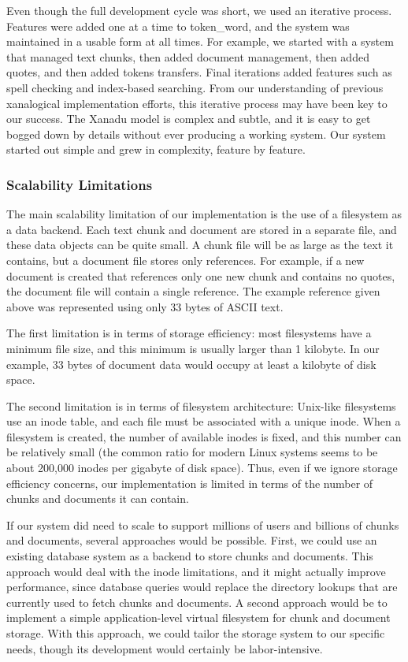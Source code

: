 \documentclass{acm_proc_article-sp}
\newcommand{\tokenWord}{token\_word}
\begin{document}
Even though the full development cycle was short, we used an iterative process.
Features were added one at a time to \tokenWord, and the system was maintained in a usable form at all times.
For example, we started with a system that managed text chunks, then added document management, then added quotes, and then added tokens transfers.
Final iterations added features such as spell checking and index-based searching.
From our understanding of previous xanalogical implementation efforts, this iterative process may have been key to our success.
The Xanadu model is complex and subtle, and it is easy to get bogged down by details without ever producing a working system.
Our system started out simple and grew in complexity, feature by feature.


\subsubsection{Scalability Limitations}
\label{sec:Scalability}
The main scalability limitation of our implementation is the use of a filesystem as a data backend.
Each text chunk and document are stored in a separate file, and these data objects can be quite small.
A chunk file will be as large as the text it contains, but a document file stores only references.
For example, if a new document is created that references only one new chunk and contains no quotes, the document file will contain a single reference.
The example reference given above was represented using only 33 bytes of ASCII text.

The first limitation is in terms of storage efficiency:  most filesystems have a minimum file size, and this minimum is usually larger than 1 kilobyte.
In our example, 33 bytes of document data would occupy at least a kilobyte of disk space.

The second limitation is in terms of filesystem architecture:  Unix-like filesystems use an inode table, and each file must be associated with a unique inode.
When a filesystem is created, the number of available inodes is fixed, and this number can be relatively small (the common ratio for modern Linux systems seems to be about 200,000 inodes per gigabyte of disk space). \cite{OperatingSystems}
Thus, even if we ignore storage efficiency concerns, our implementation is limited in terms of the number of chunks and documents it can contain.

If our system did need to scale to support millions of users and billions of chunks and documents, several approaches would be possible.
First, we could use an existing database system as a backend to store chunks and documents.
This approach would deal with the inode limitations, and it might actually improve performance, since database queries would replace the directory lookups that are currently used to fetch chunks and documents.
A second approach would be to implement a simple application-level virtual filesystem for chunk and document storage.
With this approach, we could tailor the storage system to our specific needs, though its development would certainly be labor-intensive.
\end{document}
